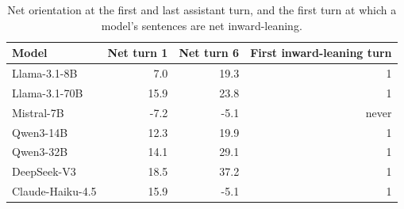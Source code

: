 \begin{table}[t]
\centering
\small
\caption{Net orientation at the first and last assistant turn, and the first turn at which a model's sentences are net inward-leaning.}
\label{tab:crossing}
\begin{tabular}{lrrr}
\toprule
Model & Net turn 1 & Net turn 6 & First inward-leaning turn \\
\midrule
Llama-3.1-8B & 7.0 & 19.3 & 1 \\
Llama-3.1-70B & 15.9 & 23.8 & 1 \\
Mistral-7B & -7.2 & -5.1 & never \\
Qwen3-14B & 12.3 & 19.9 & 1 \\
Qwen3-32B & 14.1 & 29.1 & 1 \\
DeepSeek-V3 & 18.5 & 37.2 & 1 \\
Claude-Haiku-4.5 & 15.9 & -5.1 & 1 \\
\bottomrule
\end{tabular}
\end{table}
